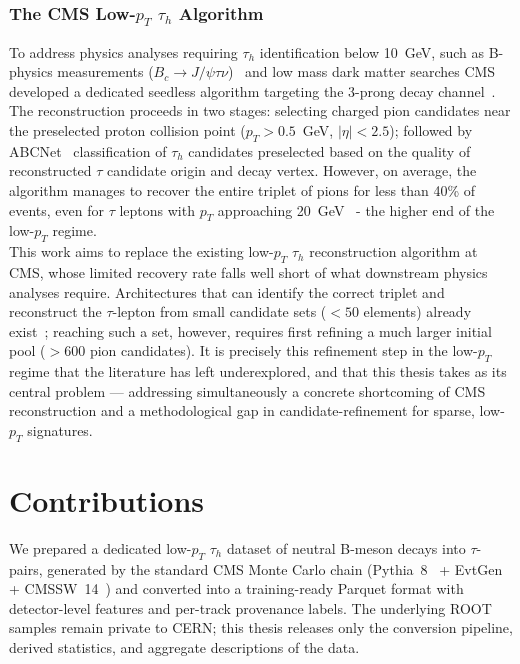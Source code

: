 \subsubsection{The CMS Low-$p_T$ $\tau_h$ Algorithm}

To address physics analyses requiring $\tau_h$ identification below 10~GeV, such as B-physics measurements ($B_c \to J/\psi\tau\nu$)~\cite{lhcb_rd_semitauonic_2019,belle_b0_kstar_tautau} and low mass dark matter searches CMS developed a dedicated seedless algorithm targeting the 3-prong decay channel~\cite{abcnet-low-pt}. The reconstruction proceeds in two stages: selecting charged pion candidates near the preselected proton collision point ($p_T > 0.5$~GeV, $|\eta| < 2.5$); followed by ABCNet~\cite{abcnet} classification of $\tau_h$ candidates preselected based on the quality of reconstructed $\tau$ candidate origin and decay vertex. However, on average, the algorithm manages to recover the entire triplet of pions for less than 40\% of events, even for $\tau$ leptons with $p_T$ approaching 20~GeV~ - the higher end of the low-$p_T$ regime.\\

This work aims to replace the existing low-$p_T$ $\tau_h$ reconstruction algorithm at CMS, whose limited recovery rate falls well short of what downstream physics analyses require. Architectures that can identify the correct triplet and reconstruct the $\tau$-lepton from small candidate sets ($<50$ elements) already exist~\cite{tau_unified_ml_2024,gnn_tau_future_colliders}; reaching such a set, however, requires first refining a much larger initial pool ($>600$ pion candidates). It is precisely this refinement step in the low-$p_T$ regime that the literature has left underexplored, and that this thesis takes as its central problem — addressing simultaneously a concrete shortcoming of CMS reconstruction and a methodological gap in candidate-refinement for sparse, low-$p_T$ signatures.

\section{Contributions}

We prepared a dedicated low-$p_T$ $\tau_h$ dataset of neutral B-meson decays into $\tau$-pairs, generated by the standard CMS Monte Carlo chain (Pythia~8~\cite{10.21468/SciPostPhysCodeb.8} + EvtGen~\cite{EvtGen} + CMSSW~14~\cite{CMSSW}) and converted into a training-ready Parquet format with detector-level features and per-track provenance labels. The underlying ROOT samples remain private to CERN; this thesis releases only the conversion pipeline, derived statistics, and aggregate descriptions of the data.


